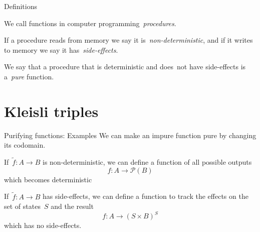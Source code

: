 \documentclass[notes]{beamer}
\begin{document}
\begin{frame}{Definitions}
    \begin{definition}[Procedure]
        We call functions in computer programming~\emph{procedures}.
    \end{definition}

    \pause

    \begin{definition}
        If a procedure reads from memory we say it is~\emph{non-deterministic},
        and if it writes to memory we say it has~\emph{side-effects}.

        We say that a procedure that is deterministic and does~\alert{not} have
        side-effects is a~\emph{pure} function.
    \end{definition}
\end{frame}

\section{Kleisli triples}

\begin{frame}{Purifying functions: Examples}
    We can make an impure function pure by changing its codomain.


    \pause

    \begin{example}
        If~\(\tilde{f}:A\longrightarrow B\) is non-deterministic, we can define
        a function of all possible outputs
        \[
            f:A\longrightarrow\mathcal{P}(B)
        \]
        which becomes deterministic
    \end{example}

    \pause

    \begin{example}
        If~\(\tilde{f}:A\longrightarrow B\) has side-effects, we can define a
        function to track the effects on the set of states~\(S\) and the result
        \[
            f:A\longrightarrow(S\times B)^{S}
        \]
        which has no side-effects.
    \end{example}
\end{frame}
\end{document}
